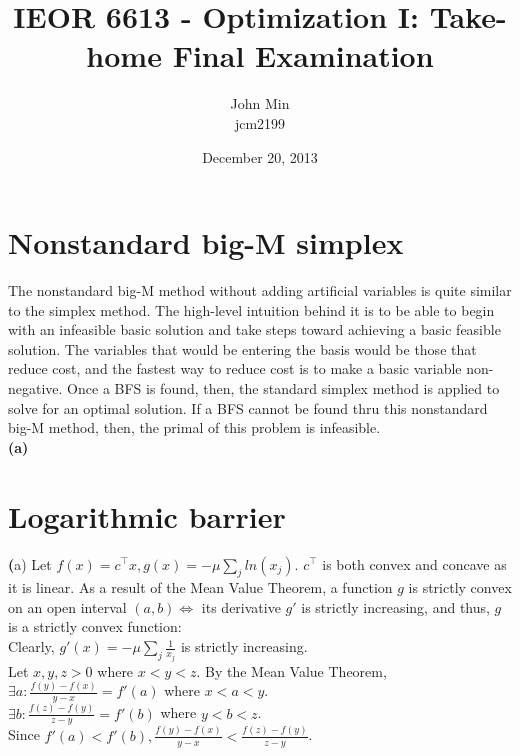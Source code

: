 \documentclass{article}
\begin{document}
\title{IEOR 6613 - Optimization I: Take-home Final Examination}

\author{John Min\\ jcm2199}
\date{December 20, 2013}
\maketitle

\section{Nonstandard big-M simplex}
The nonstandard big-M method without adding artificial variables is quite similar to the simplex method.  The high-level intuition behind it is to be able to begin with an infeasible basic solution and take steps toward achieving a basic feasible solution.  The variables that would be entering the basis would be those that reduce cost, and the fastest way to reduce cost is to make a basic variable non-negative.  Once a BFS is found, then, the standard simplex method is applied to solve for an optimal solution.  If a BFS cannot be found thru this nonstandard big-M method, then, the primal of this problem is infeasible. \\

\noindent
\textbf{(a)}

\section{Logarithmic barrier}

\textbf(a)
Let $f(x) = c^\top x, g(x) = - \mu \sum_j ln(x_j)$.  $c^\top $ is both convex and concave as it is linear.   As a result of the Mean Value Theorem, a function $g$ is strictly convex on an open interval $(a,b) \Leftrightarrow$ its derivative $g'$ is strictly increasing, and thus, $g$ is a strictly convex function: \\

\noindent
Clearly, $g'(x) = -\mu \sum_j  \frac{1}{x_j}$ is strictly increasing.\\

\noindent
Let $x,y,z > 0$ where $x < y < z$.  By the Mean Value Theorem, \\
$\exists a : \frac{f(y) - f(x)}{y - x} = f'(a)$ where $x < a < y$. \\
$ \exists b: \frac{f(z) - f(y)}{z - y} = f'(b)$ where $y < b < z$. \\

\noindent
Since $f'(a) < f'(b), \frac{f(y) - f(x)}{y - x} < \frac{f(z) - f(y)}{z - y}$. \\
\end{document}
